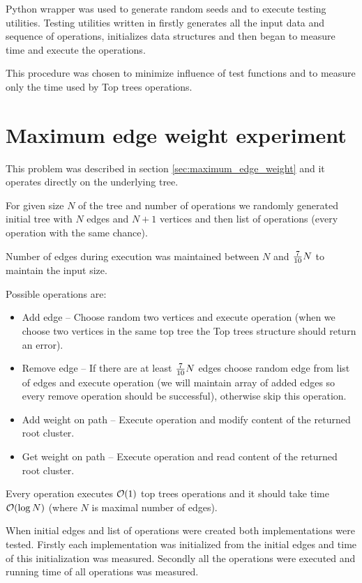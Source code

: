 Python wrapper was used to generate random seeds and to execute testing utilities.
Testing utilities written in \Cpp{} firstly generates all the input data and
sequence of operations, initializes data structures and then began to measure
time and execute the operations.

This procedure was chosen to minimize influence of test functions and to measure
only the time used by Top trees operations.

\vfill\eject %

\section{Maximum edge weight experiment}
\label{sec:experiment_maximum_edge_weight}

This problem was described in section \ref{sec:maximum_edge_weight} and it
operates directly on the underlying tree.

For given size $N$ of the tree and number of operations we randomly generated
initial tree with $N$ edges and $N+1$ vertices and then list of operations
(every operation with the same chance).

Number of edges during execution was maintained between $N$ and ${7\over 10}N$
to maintain the input size.

Possible operations are:

\begin{itemize}
\item Add edge -- Choose random two vertices and execute \Link{} operation
(when we choose two vertices in the same top tree the Top trees structure should
return an error).
\item Remove edge -- If there are at least ${7\over10}N$ edges choose random
edge from list of edges and execute \Cut{} operation (we will maintain array of
added edges so every remove operation should be successful), otherwise skip this
operation.
\item Add weight on path -- Execute \Expose{} operation and modify content of
the returned root cluster.
\item Get weight on path -- Execute \Expose{} operation and read content of the
returned root cluster.
\end{itemize}

Every operation executes ${\cal O}(1)$ top trees operations and it should take time
${\cal O}(\log N)$ (where $N$ is maximal number of edges).

When initial edges and list of operations were created both implementations were
tested. Firstly each implementation was initialized from the initial edges and
time of this initialization was measured. Secondly all the operations were
executed and running time of all operations was measured.

